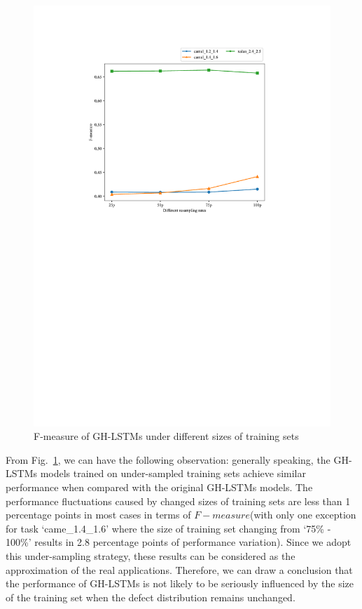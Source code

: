 \documentclass[journal]{IEEEtran}
\begin{document}
\begin{figure}[h]
	\centering
	\includegraphics[scale=0.6]{figs/resampling_rates.pdf}
	\caption{F-measure of GH-LSTMs under different sizes of training sets}
	\label{fig_size}
\end{figure}
From Fig.~\ref{fig_size}, we can have the following observation: generally speaking, the GH-LSTMs models trained on under-sampled training sets achieve similar performance when compared with the original GH-LSTMs models. The performance fluctuations caused by changed sizes of training sets are less than 1 percentage points in most cases in terms of $F-measure$(with only one exception for task `came\_1.4\_1.6' where the size of training set changing from `75\% - 100\%' results in 2.8 percentage points of performance variation). Since we adopt this under-sampling strategy, these results can be considered as the approximation of the real applications. Therefore, we can draw a conclusion that the performance of GH-LSTMs is not likely to be seriously influenced by the size of the training set when the defect distribution remains unchanged.
\end{document}
